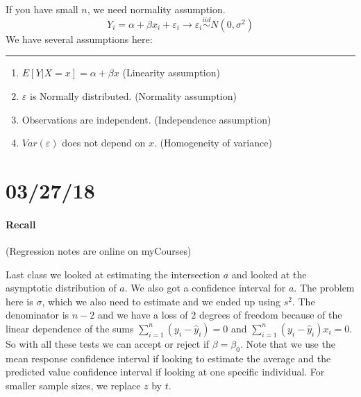 \documentclass[12 pt]{article}
\begin{document}
If you have small $n$, we need normality assumption.
$$ Y_i = \alpha + \beta x_i + \varepsilon_i \to \varepsilon_i
\stackrel{iid}{\sim}N(0,\sigma^2)$$
We have several assumptions here:
\\ \noindent \rule{\textwidth}{0.5pt}
\begin{enumerate}
\item $E[Y|X=x]=\alpha + \beta x$ (Linearity assumption)
\item $\varepsilon$ is Normally distributed. (Normality assumption)
\item Observations are independent. (Independence assumption)
\item $Var(\varepsilon)$ does not depend on $x$. (Homogeneity of variance)
\end{enumerate}
\section{03/27/18}
\paragraph{Recall} (Regression notes are online on myCourses)

Last class we looked at estimating the intersection
$a$ and looked at the asymptotic distribution of $a$. We also got a
confidence interval for $a$. The problem here is $\sigma$, which we
also need to estimate and we ended up using $s^2$. The denominator is
$n-2$ and we have a loss of $2$ degrees of freedom because of the
linear dependence of the sums $\sum_{i=1}^n (y_i - \hat{y}_i) = 0$ and
$\sum_{i=1}^n (y_i - \hat{y}_i)x_i = 0$. So with all these tests we
can accept or reject if $\beta = \beta_0$. Note that we use the mean
response confidence interval if looking to estimate the average and
the predicted value confidence interval if looking at one specific
individual. For smaller sample sizes, we replace $z$ by $t$.
\end{document}
